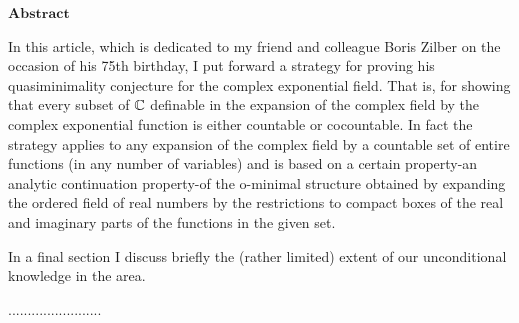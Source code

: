 \documentclass[12pt,nodate]{article}
\begin{document}
\maketitle
\date{}

\vspace{5mm}

\hspace{53mm} $\mathbf{Abstract}$

\vspace{3mm}

In this article, which is dedicated to my friend and colleague Boris Zilber on the occasion of his 75th birthday, I put forward a strategy for proving his quasiminimality conjecture for the complex exponential field. That is, for showing that every subset of $\mathbb{C}$ definable in the expansion of the complex field by the complex exponential function is either countable or cocountable. In fact the strategy applies to any expansion of the complex field by a countable set of entire functions (in any number of variables) and is based on a certain property-an analytic continuation property-of the o-minimal structure obtained by expanding the ordered field of real numbers by the restrictions to compact boxes of the real and imaginary parts of the functions in the given set.

In a final section I discuss briefly the (rather limited) extent of our unconditional knowledge in the area.

\vspace{3mm}

\hspace{48mm} ........................

\vspace{3mm}
\end{document}
